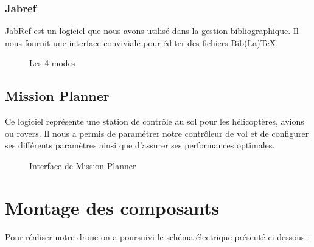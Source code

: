 \documentclass[a4paper,12pt]{book}
\begin{document}
\subsubsection{Jabref}
JabRef est un logiciel que nous avons utilisé dans la gestion bibliographique. Il nous fournit une interface conviviale pour éditer des fichiers Bib(La)TeX.
\begin{figure}[h]
	\begin{center}
		\centering
	\end{center}
	\caption{Les 4 modes}
\end{figure}
\subsection{Mission Planner	}
Ce logiciel représente une station de contrôle au sol pour les hélicoptères, avions ou rovers. Il nous a permis de paramétrer notre contrôleur de vol et de configurer ses différents paramètres ainsi que d'assurer ses performances optimales.
\begin{figure} [h]
	\begin{center}
		\centering
\hspace*{1.5cm}
	\centering
\hspace*{1.5cm}	\caption{Interface de Mission Planner}
\end{center}
\end{figure}
\newpage
\section{Montage des composants}
Pour réaliser notre drone on a poursuivi le schéma électrique présenté ci-dessous :
\end{document}
